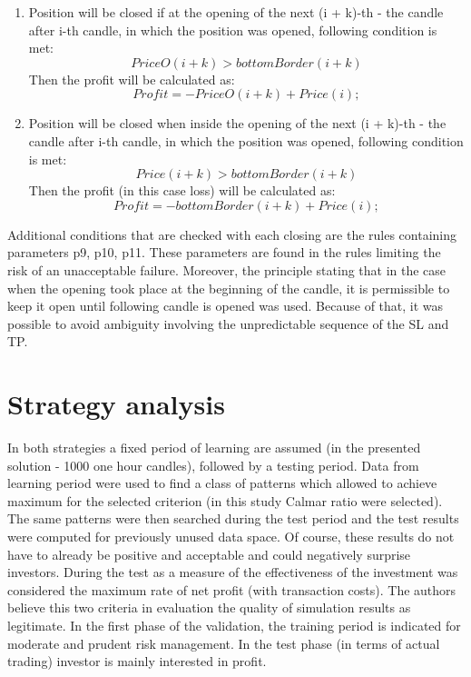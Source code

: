 \documentclass{tewiart}
\begin{document}
\begin{enumerate}
\item Position will be closed if at the opening of the next (i + k)-th - the candle after i-th candle, in which the position was opened, following condition is met: 
\begin{equation}
PriceO(i+k) >bottomBorder(i+k)
\end{equation}                          
Then the profit will be calculated as:
\begin{equation}
Profit =-PriceO (i+k)  + Price(i) ;
\end{equation}

\item Position will be closed when inside the opening of the next (i + k)-th - the candle after i-th candle, in which the position was opened, following condition is met:
\begin{equation}
Price(i+k) >bottomBorder(i+k)
\end{equation}                           
Then the profit (in this case loss) will be calculated as:
\begin{equation}
Profit =-bottomBorder (i+k) +  Price(i) ;
\end{equation}

\end{enumerate}
Additional conditions that are checked with each closing are the rules containing parameters p9, p10, p11. These parameters are found in the rules limiting the risk of an unacceptable failure. Moreover, the principle stating that in the case when the opening took place at the beginning of the candle, it is permissible to keep it open until following candle is opened was used. Because of that,  it was possible to avoid ambiguity involving the unpredictable sequence of the SL and TP.


\section{Strategy analysis}
In both strategies a fixed period of learning are assumed (in the presented solution - 1000 one hour candles), followed by a testing period. Data from learning period were used to find a class of patterns which allowed to achieve maximum for the selected criterion (in this study Calmar ratio were selected). The same patterns were then searched during the test period and the test results were computed for previously unused data space. Of course, these results do not have to already be positive and acceptable and could negatively surprise investors. During the test as a measure of the effectiveness of the investment was considered the maximum rate of net profit (with transaction costs). The authors believe this two criteria in evaluation the quality of simulation results as legitimate. In the first phase of the validation, the training period is indicated for moderate and prudent risk management. In the test phase (in terms of actual trading) investor is mainly interested in profit.\\
\end{document}
